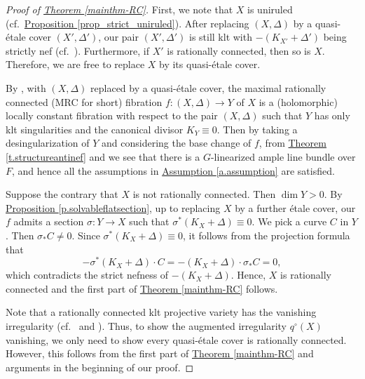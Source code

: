 \begin{proof}[Proof of {\hyperref[mainthm-RC]{Theorem \ref*{mainthm-RC}}}]
First, we note that $X$ is uniruled (cf.~{\hyperref[prop_strict_uniruled]{Proposition \ref*{prop_strict_uniruled}}}). 
After replacing $(X,\Delta)$ by a quasi-\'etale cover $(X',\Delta')$, our pair $(X',\Delta')$ is still klt with $-(K_{X'}+\Delta')$ being strictly nef (cf.~\cite[Proposition 5.20]{KM98}).
Furthermore, if $X'$ is rationally connected, then so is $X$.
Therefore, we are free to replace $X$ by its quasi-\'etale cover.

By \cite[Theorem 1.1]{MW21}, with $(X,\Delta)$ replaced by a quasi-\'etale cover, the maximal rationally connected (MRC for short) fibration $f:(X,\Delta)\to Y$ of $X$ is a (holomorphic) locally constant fibration with respect to the pair $(X,\Delta)$ such that $Y$ has only klt singularities and the canonical divisor $K_Y\equiv 0$. 
Then by taking a desingularization of $Y$ and considering the base change of $f$, from {\hyperref[t.structureantinef]{Theorem \ref*{t.structureantinef}}} and \cite[Theorem 1.1]{Tak03} we see that there is a $G$-linearized ample line bundle over $F$, and hence all the assumptions in {\hyperref[a.assumption]{Assumption \ref*{a.assumption}}} are satisfied.  


Suppose the contrary that $X$ is not rationally connected.
Then $\dim Y>0$.
By {\hyperref[p.solvableflatsection]{Proposition  \ref*{p.solvableflatsection}}}, up to replacing $X$ by a further \'etale cover, our $f$ admits a section $\sigma:Y\to X$ such that $\sigma^*(K_X+\Delta)\equiv 0$. 
We pick a curve $C$ in $Y$. 
Then $\sigma_\ast C\neq 0$. 
Since $\sigma^\ast(K_X+\Delta)\equiv0$, it follows from the projection formula that
\[
-\sigma^\ast(K_X+\Delta)\cdot C=-(K_X+\Delta)\cdot\sigma_\ast C=0,
\]
which contradicts the strict nefness of $-(K_X+\Delta)$. 
Hence, $X$ is rationally connected and the first part of {\hyperref[mainthm-RC]{Theorem \ref*{mainthm-RC}}} follows. 

Note that a rationally connected klt projective variety has the vanishing irregularity (cf.~\cite[Corollary 4.18]{Deb01} and \cite[Theorem 5.22]{KM98}). Thus, to show the augmented irregularity $q^\circ(X)$ vanishing, we only need to show every quasi-\'etale cover is rationally connected.
However, this follows from the first part of {\hyperref[mainthm-RC]{Theorem \ref*{mainthm-RC}}} and arguments in the beginning of our proof.
\end{proof}

